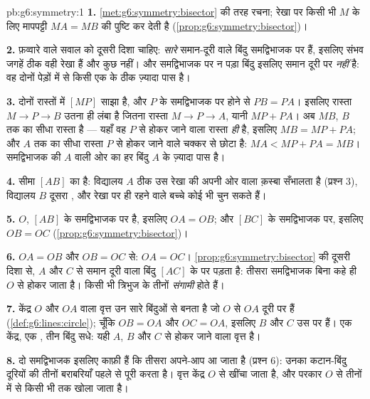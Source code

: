 \begin{solution}{pb:g6:symmetry:1}
\textbf{1.} \cref{met:g6:symmetry:bisector} की तरह रचना;
रेखा पर किसी भी $M$ के लिए मापपट्टी $MA = MB$ की पुष्टि कर देती है
(\cref{prop:g6:symmetry:bisector})।

\textbf{2.} फ़व्वारे वाले सवाल को दूसरी दिशा चाहिए:
\emph{सारे} समान-दूरी वाले बिंदु समद्विभाजक पर हैं, इसलिए संभव
जगहें ठीक वही रेखा हैं और कुछ नहीं। और समद्विभाजक पर न पड़ा
बिंदु इसलिए समान दूरी पर \emph{नहीं} है: वह दोनों पेड़ों में से
किसी एक के ठीक ज़्यादा पास है।

\textbf{3.} दोनों रास्तों में $[MP]$ साझा है, और $P$ के
समद्विभाजक पर होने से $PB = PA$। इसलिए रास्ता $M \to P \to B$
उतना ही लंबा है जितना रास्ता $M \to P \to A$, यानी $MP + PA$।
अब $MB$, $B$ तक का सीधा रास्ता है --- यहाँ वह $P$ से होकर जाने
वाला रास्ता \emph{ही} है, इसलिए $MB = MP + PA$; और $A$ तक का
सीधा रास्ता $P$ से होकर जाने वाले चक्कर से छोटा है:
$MA < MP + PA = MB$। समद्विभाजक की $A$ वाली ओर का हर बिंदु $A$ के ज़्यादा पास है।

\textbf{4.} सीमा $[AB]$ का  है: विद्यालय $A$ ठीक
उस रेखा की अपनी ओर वाला  क़स्बा सँभालता है (प्रश्न 3),
विद्यालय $B$ दूसरा , और रेखा पर ही रहने वाले बच्चे कोई भी चुन
सकते हैं।

\textbf{5.} $O$, $[AB]$ के समद्विभाजक पर है, इसलिए $OA = OB$;
और $[BC]$ के समद्विभाजक पर, इसलिए $OB = OC$
(\cref{prop:g6:symmetry:bisector})।

\textbf{6.} $OA = OB$ और $OB = OC$ से: $OA = OC$।
\cref{prop:g6:symmetry:bisector} की दूसरी दिशा से, $A$ और $C$ से
समान दूरी वाला बिंदु $[AC]$ के  पर पड़ता है:
तीसरा समद्विभाजक बिना कहे ही $O$ से होकर जाता है। किसी भी
त्रिभुज के तीनों  \emph{संगामी} होते हैं।

\textbf{7.} केंद्र $O$ और  $OA$ वाला वृत्त उन सारे
बिंदुओं से बनता है जो $O$ से $OA$ दूरी पर हैं
(\cref{def:g6:lines:circle}); चूँकि $OB = OA$ और $OC = OA$,
इसलिए $B$ और $C$ उस पर हैं। एक केंद्र, एक , तीन बिंदु
सधे: यही $A$, $B$ और $C$ से होकर जाने वाला वृत्त है।

\textbf{8.} दो समद्विभाजक इसलिए काफ़ी हैं कि तीसरा अपने-आप आ
जाता है (प्रश्न 6): उनका कटान-बिंदु दूरियों की तीनों बराबरियाँ
पहले से पूरी करता है। वृत्त केंद्र $O$ से खींचा जाता है, और
परकार $O$ से तीनों में से किसी भी  तक खोला जाता है।


\end{solution}
